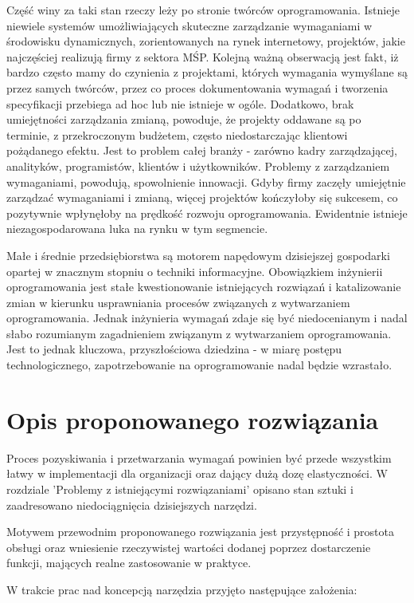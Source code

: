     Część winy za taki stan rzeczy leży po stronie twórców oprogramowania. Istnieje niewiele systemów umożliwiających skuteczne zarządzanie wymaganiami w środowisku dynamicznych, zorientowanych na rynek internetowy, projektów, jakie najczęściej realizują firmy z sektora MŚP. Kolejną ważną obserwacją jest fakt, iż bardzo często mamy do czynienia z projektami, których wymagania wymyślane są przez samych twórców, przez co proces dokumentowania wymagań i tworzenia specyfikacji przebiega ad hoc lub nie istnieje w ogóle. Dodatkowo, brak umiejętności zarządzania zmianą, powoduje, że projekty oddawane są po terminie, z przekroczonym budżetem, często niedostarczając klientowi pożądanego efektu. Jest to problem całej branży - zarówno kadry zarządzającej, analityków, programistów, klientów i użytkowników. Problemy z zarządzaniem wymaganiami, powodują, spowolnienie innowacji. Gdyby firmy zaczęły umiejętnie zarządzać wymaganiami i zmianą, więcej projektów kończyłoby się sukcesem, co pozytywnie wpłynęłoby na prędkość rozwoju oprogramowania. Ewidentnie istnieje niezagospodarowana luka na rynku w tym segmencie. 

    Małe i średnie przedsiębiorstwa są motorem napędowym dzisiejszej gospodarki opartej w znacznym stopniu o techniki informacyjne. Obowiązkiem inżynierii oprogramowania jest stałe kwestionowanie istniejących rozwiązań i katalizowanie zmian w kierunku usprawniania procesów związanych z wytwarzaniem oprogramowania. Jednak inżynieria wymagań zdaje się być niedocenianym i nadal słabo rozumianym zagadnieniem związanym z wytwarzaniem oprogramowania. Jest to jednak kluczowa, przyszłościowa dziedzina - w miarę postępu technologicznego, zapotrzebowanie na oprogramowanie nadal będzie wzrastało.

  \section{Opis proponowanego rozwiązania}

    Proces pozyskiwania i przetwarzania wymagań powinien być przede wszystkim łatwy w implementacji dla organizacji oraz dający dużą dozę elastyczności. W rozdziale 'Problemy z istniejącymi rozwiązaniami' opisano stan sztuki i zaadresowano niedociągnięcia dzisiejszych narzędzi. 

    Motywem przewodnim proponowanego rozwiązania jest przystępność i prostota obsługi oraz wniesienie rzeczywistej wartości dodanej poprzez dostarczenie funkcji, mających realne zastosowanie w praktyce. 

    W trakcie prac nad koncepcją narzędzia przyjęto następujące założenia:
    
